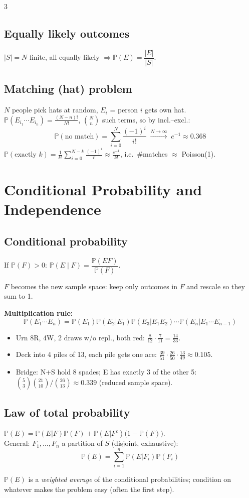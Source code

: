 \documentclass[8pt]{extarticle}
\newcommand{\PP}{\mathbb{P}}
\begin{document}
\begin{multicols*}{3}
\subsection{Equally likely outcomes}
$|S|=N$ finite, all equally likely $\Rightarrow \PP(E)=\dfrac{|E|}{|S|}$.
\subsection{Matching (hat) problem}
$N$ people pick hats at random, $E_i$ = person $i$ gets own hat. $\PP(E_{i_1}\cdots E_{i_n})=\frac{(N-n)!}{N!}$, $\binom Nn$ such terms, so by incl.--excl.:
\[\PP(\text{no match})=\sum_{i=0}^N\frac{(-1)^i}{i!}\;\xrightarrow{N\to\infty}\;e^{-1}\approx0.368\]
$\PP(\text{exactly }k)=\frac1{k!}\sum_{i=0}^{N-k}\frac{(-1)^i}{i!}\approx\frac{e^{-1}}{k!}$, i.e.\ \#matches $\approx$ Poisson(1).


\section{Conditional Probability and Independence}
\subsection{Conditional probability}
If $\PP(F)>0$: \quad $\PP(E\mid F)=\dfrac{\PP(EF)}{\PP(F)}$.
\begin{idea}$F$ becomes the new sample space: keep only outcomes in $F$ and rescale so they sum to 1.\end{idea}
\textbf{Multiplication rule:}\[\PP(E_1\cdots E_n)=\PP(E_1)\PP(E_2|E_1)\PP(E_3|E_1E_2)\cdots\PP(E_n|E_1\cdots E_{n-1})\]
\begin{itemize}
\item Urn 8R, 4W, 2 draws w/o repl., both red: $\frac8{12}\cdot\frac7{11}=\frac{14}{33}$.
\item Deck into 4 piles of 13, each pile gets one ace: $\frac{39}{51}\cdot\frac{26}{50}\cdot\frac{13}{49}\approx0.105$.
\item Bridge: N+S hold 8 spades; E has exactly 3 of the other 5: $\binom53\binom{21}{10}/\binom{26}{13}\approx0.339$ (reduced sample space).
\end{itemize}

\subsection{Law of total probability}
$\PP(E)=\PP(E|F)\PP(F)+\PP(E|F^c)\big(1-\PP(F)\big)$.\\
General: $F_1,\dots,F_n$ a partition of $S$ (disjoint, exhaustive):
\[\PP(E)=\sum_{i=1}^n\PP(E|F_i)\PP(F_i)\]
\begin{idea}$\PP(E)$ is a \emph{weighted average} of the conditional probabilities; condition on whatever makes the problem easy (often the first step).\end{idea}


\end{multicols*}
\end{document}
